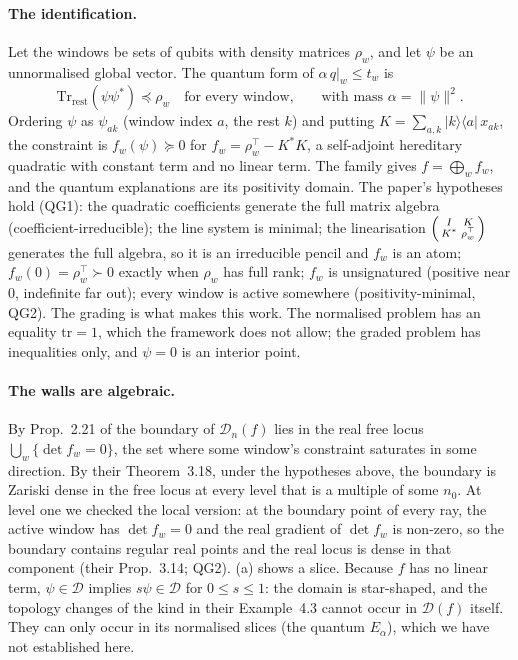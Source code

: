 \documentclass[11pt]{article}
\theoremstyle{definition}\newtheorem{definition}[theorem]{Definition}\newtheorem{remark}[theorem]{Remark}\newtheorem{example}[theorem]{Example}
\begin{document}
\paragraph{The identification.}
Let the windows be sets of qubits with density matrices $\rho_w$, and let $\psi$ be an unnormalised global vector. The quantum form of
$\alpha\,q|_w\le t_w$ is
\[
  \mathrm{Tr}_{\mathrm{rest}}(\psi\psi^*)\preceq\rho_w\quad\text{for every window,}\qquad\text{with mass }\alpha=\|\psi\|^2 .
\]
Ordering $\psi$ as $\psi_{ak}$ (window index $a$, the rest $k$) and putting $K=\sum_{a,k}|k\rangle\langle a|\,x_{ak}$, the constraint is
$f_w(\psi)\succeq0$ for $f_w=\rho_w^{\top}-K^*K$, a self-adjoint hereditary quadratic with constant term and no linear term. The family gives
$f=\bigoplus_wf_w$, and the quantum explanations are its positivity domain. The paper's hypotheses hold (QG1): the quadratic coefficients
generate the full matrix algebra (coefficient-irreducible); the line system is minimal; the linearisation
$\begin{psmallmatrix}I&K\\K^*&\rho_w^\top\end{psmallmatrix}$ generates the full algebra, so it is an irreducible pencil and $f_w$ is an atom;
$f_w(0)=\rho_w^\top\succ0$ exactly when $\rho_w$ has full rank; $f_w$ is unsignatured (positive near $0$, indefinite far out); every window is
active somewhere (positivity-minimal, QG2). The grading is what makes this work. The normalised problem has an equality $\mathrm{tr}=1$,
which the framework does not allow; the graded problem has inequalities only, and $\psi=0$ is an interior point.

\paragraph{The walls are algebraic.}
By Prop.~2.21 of \cite{IVW2026} the boundary of $\mathcal D_n(f)$ lies in the real free locus $\bigcup_w\{\det f_w=0\}$, the set where some
window's constraint saturates in some direction. By their Theorem~3.18, under the hypotheses above, the boundary is Zariski dense in the
free locus at every level that is a multiple of some $n_0$. At level one we checked the local version: at the boundary point of every ray,
the active window has $\det f_w=0$ and the real gradient of $\det f_w$ is non-zero, so the boundary contains regular real points and the
real locus is dense in that component (their Prop.~3.14; QG2). (a) shows a slice. Because $f$ has no linear term,
$\psi\in\mathcal D$ implies $s\psi\in\mathcal D$ for $0\le s\le1$: the domain is star-shaped, and the topology changes of the kind in their
Example~4.3 cannot occur in $\mathcal D(f)$ itself. They can only occur in its normalised slices (the quantum $E_\alpha$), which we have
not established here.
\end{document}
